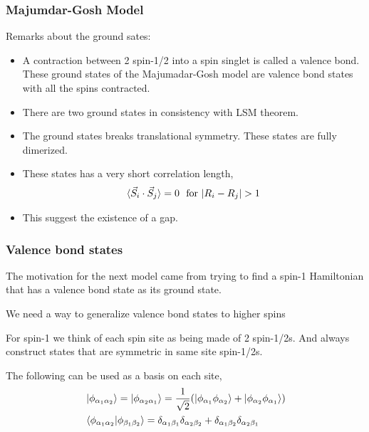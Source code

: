 \documentclass{beamer}
\begin{document}
\begin{frame}
    \frametitle{Majumdar-Gosh Model}
    Remarks about the ground sates: 
    \begin{itemize}
        \item A contraction between 2 spin-1/2 into a spin singlet is called a valence bond. These ground states of the Majumadar-Gosh model are valence bond states with all the spins contracted. \pause 
        \item There are two ground states in consistency with LSM theorem. \pause 
        \item The ground states breaks translational symmetry. These states are fully dimerized. \pause
        \item These states has a very short correlation length, \begin{align*}
            \braket{\vec{S}_{i} \cdot \vec{S}_{j}} = 0 \ \  \text{for} \  |R_i-R_j| > 1
        \end{align*}\pause
        \item This suggest the existence of a gap.  
    \end{itemize}

\end{frame}

\begin{frame}
    \frametitle{Valence bond states} 
    The motivation for the next model came from trying to find a spin-1 Hamiltonian that has a valence bond state as its ground state. \pause 

    We need a way to generalize valence bond states to higher spins\pause 

    For spin-1 we think of each spin site as being made of 2 spin-1/2s. And always construct states that are symmetric in same site spin-1/2s. \pause 

    The following can be used as a basis on each site, 
    \begin{align*}
        &\ket{\phi_{\alpha_1\alpha_2}} = \ket{\phi_{\alpha_2\alpha_1}} = \frac{1}{\sqrt{2}}(\ket{\phi_{\alpha_1} \phi_{\alpha_2}} + \ket{\phi_{\alpha_2} \phi_{\alpha_1}}) \nonumber \\ 
        & \braket{\phi_{\alpha_1 \alpha_2} | \phi_{\beta_1 \beta_2}} = \delta_{\alpha_1 \beta_1} \delta_{\alpha_2\beta_2} + \delta_{\alpha_1\beta_2}\delta_{\alpha_2\beta_1}
    \end{align*}
\end{frame}
\end{document}
